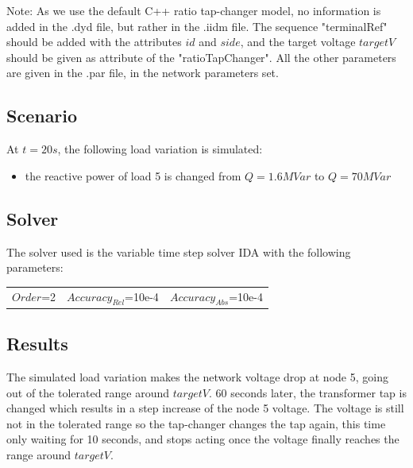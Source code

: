 \documentclass[a4paper, 12pt]{report}
\begin{document}
Note: As we use the default C++ ratio tap-changer model, no information is added in the .dyd file, but rather in the .iidm file. The sequence "terminalRef" should be added with the attributes $id$ and $side$, and the target voltage $targetV$ should be given as attribute of the "ratioTapChanger". All the other parameters are given in the .par file, in the network parameters set.

\subsection{Scenario}
At $t=20s$, the following load variation is simulated:
\begin{itemize}
\item{the reactive power of load 5 is changed from $Q=1.6MVar$ to $Q=70MVar$}
\end{itemize}

\subsection{Solver}
The solver used is the variable time step solver IDA with the following parameters:
\begin{center}
\begin{tabular}{l|l|l}
   $Order$=2 & $Accuracy_{Rel}$=10e-4 & $Accuracy_{Abs}$=10e-4 \\
\end{tabular}
\end{center}

\subsection{Results}

The simulated load variation makes the network voltage drop at node 5, going out of the tolerated range around $targetV$. 60 seconds later, the transformer tap is changed which results in a step increase of the node 5 voltage. The voltage is still not in the tolerated range so the tap-changer changes the tap again, this time only waiting for 10 seconds, and stops acting once the voltage finally reaches the range around $targetV$.
\end{document}
